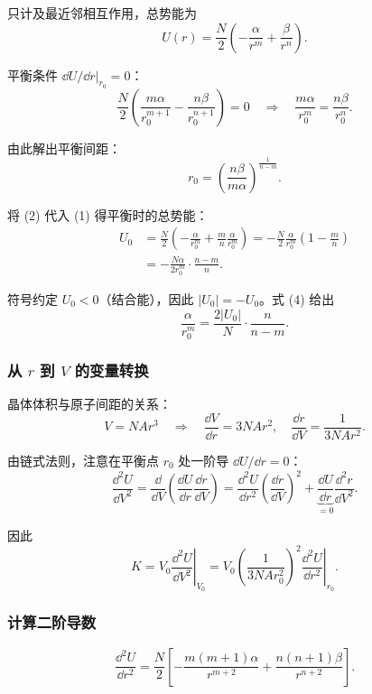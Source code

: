 只计及最近邻相互作用，总势能为
\[
  U(r) = \frac{N}{2}\left(-\frac{\alpha}{r^m} + \frac{\beta}{r^n}\right). \tag{1}
\]

平衡条件 $\dd U/\dd r|_{r_0} = 0$：
\[
  \frac{N}{2}\left(\frac{m\alpha}{r_0^{m+1}} - \frac{n\beta}{r_0^{n+1}}\right) = 0
  \quad\Longrightarrow\quad
  \frac{m\alpha}{r_0^m} = \frac{n\beta}{r_0^n}. \tag{2}
\]

由此解出平衡间距：
\[
  r_0 = \left(\frac{n\beta}{m\alpha}\right)^{\!\frac{1}{n-m}}. \tag{3}
\]

将 (2) 代入 (1) 得平衡时的总势能：
\begin{align*}
  U_0 &= \frac{N}{2}\left(-\frac{\alpha}{r_0^m} + \frac{m}{n}\frac{\alpha}{r_0^m}\right)
      = -\frac{N}{2}\frac{\alpha}{r_0^m}\left(1 - \frac{m}{n}\right) \\
      &= -\frac{N\alpha}{2r_0^m}\cdot\frac{n-m}{n}. \tag{4}
\end{align*}

\begin{tipbox}{符号约定}
$U_0 < 0$（结合能），因此 $|U_0| = -U_0$。式 (4) 给出
\[
  \frac{\alpha}{r_0^m} = \frac{2|U_0|}{N}\cdot\frac{n}{n-m}. \tag{4'}
\]
\end{tipbox}

\subsubsection{从 $r$ 到 $V$ 的变量转换}

晶体体积与原子间距的关系：
\[
  V = NAr^3 \quad\Longrightarrow\quad \frac{\dd V}{\dd r} = 3NAr^2,
  \quad \frac{\dd r}{\dd V} = \frac{1}{3NAr^2}. \tag{5}
\]

由链式法则，注意在平衡点 $r_0$ 处一阶导 $\dd U/\dd r = 0$：
\[
  \frac{\dd^2 U}{\dd V^2}
  = \frac{\dd}{\dd V}\!\left(\frac{\dd U}{\dd r}\frac{\dd r}{\dd V}\right)
  = \frac{\dd^2 U}{\dd r^2}\left(\frac{\dd r}{\dd V}\right)^{\!2}
    + \underbrace{\frac{\dd U}{\dd r}}_{=0}\frac{\dd^2 r}{\dd V^2}.
\]

因此
\[
  K = V_0\left.\frac{\dd^2 U}{\dd V^2}\right|_{V_0}
    = V_0\left(\frac{1}{3NAr_0^2}\right)^{\!2}\left.\frac{\dd^2 U}{\dd r^2}\right|_{r_0}. \tag{6}
\]

\subsubsection{计算二阶导数}

\[
  \frac{\dd^2 U}{\dd r^2}
  = \frac{N}{2}\left[-\frac{m(m+1)\alpha}{r^{m+2}} + \frac{n(n+1)\beta}{r^{n+2}}\right].
\]

